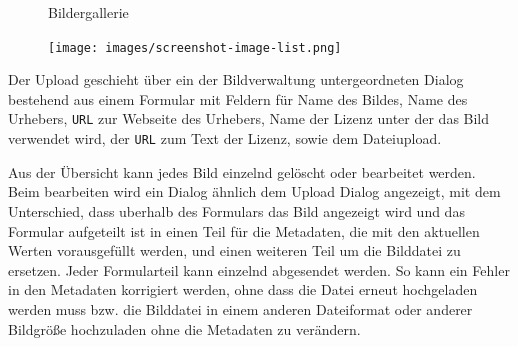 \begin{figure}
  \caption{Bildergallerie}
  \label{fig:impl-image-gallery}
\end{figure}


\begin{figure}
  \centering
  \texttt{[image: images/screenshot-image-list.png]}
\end{figure}

Der Upload geschieht über ein der Bildverwaltung untergeordneten Dialog
bestehend aus einem Formular mit Feldern für Name des Bildes, Name des Urhebers,
\texttt{URL} zur Webseite des Urhebers, Name der Lizenz unter der das Bild
verwendet wird, der \texttt{URL} zum Text der Lizenz, sowie dem Dateiupload.

Aus der Übersicht kann jedes Bild einzelnd gelöscht oder bearbeitet werden. Beim
bearbeiten wird ein Dialog ähnlich dem Upload Dialog angezeigt, mit dem
Unterschied, dass uberhalb des Formulars das Bild angezeigt wird und das
Formular aufgeteilt ist in einen Teil für die Metadaten, die mit den aktuellen
Werten vorausgefüllt werden, und einen weiteren Teil um die Bilddatei zu
ersetzen. Jeder Formularteil kann einzelnd abgesendet werden. So kann ein Fehler
in den Metadaten korrigiert werden, ohne dass die Datei erneut hochgeladen
werden muss bzw. die Bilddatei in einem anderen Dateiformat oder anderer
Bildgröße hochzuladen ohne die Metadaten zu verändern.

